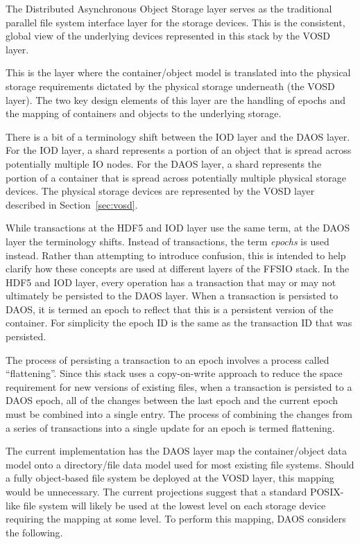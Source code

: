 \documentclass[conference]{IEEEtran}
\begin{document}
The Distributed Asynchronous Object Storage layer serves as the traditional
parallel file system interface layer for the storage devices. This is the
consistent, global view of the underlying devices represented in this stack
by the VOSD layer.

This is the layer where the container/object model is translated into the
physical storage requirements dictated by the physical storage underneath (the
VOSD layer). The two key design elements of this layer are the handling of
epochs and the mapping of containers and objects to the underlying storage.

There is a bit of a terminology shift between the IOD layer and the DAOS
layer. For the IOD layer, a shard represents a portion of an object that is
spread across potentially multiple IO nodes. For the DAOS layer, a shard
represents the portion of a container that is spread across potentially
multiple physical storage devices.  The physical storage devices are
represented by the VOSD layer described in Section~\ref{sec:vosd}.

While transactions at the HDF5 and IOD layer use the same term, at the DAOS
layer the terminology shifts. Instead of transactions, the term {\em epochs}
is used instead. Rather than attempting to introduce confusion, this is intended
to help clarify how these concepts are used at different layers of the FFSIO
stack. In the HDF5 and IOD layer, every operation has a transaction that may
or may not ultimately be persisted to the DAOS layer. When a transaction is
persisted to DAOS, it is termed an epoch to reflect that this is a persistent
version of the container. For simplicity the epoch ID is the same as the
transaction ID that was persisted.

The process of persisting a transaction to an epoch involves a process called
``flattening''. Since this stack uses a copy-on-write approach to reduce the
space requirement for new versions of existing files, when a transaction is
persisted to a DAOS epoch, all of the changes between the last epoch and the
current epoch must be combined into a single entry. The process of combining
the changes from a series of transactions into a single update for an epoch
is termed flattening.

The current implementation has the DAOS layer map the container/object data
model onto a directory/file data model used for most existing file systems.
Should a fully object-based file system be deployed at the VOSD layer, this
mapping would be unnecessary. The current projections suggest that a standard
POSIX-like file system will likely be used at the lowest level on each storage
device requiring the mapping at some level. To perform this mapping, DAOS
considers the following.
\end{document}
